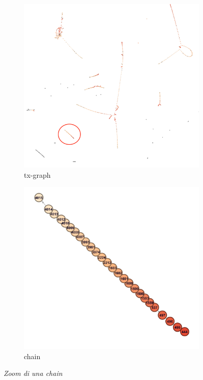 \begin{figure}[htbp]
	\centering
	\begin{subfigure}[b]{0.4\textwidth}
		\includegraphics[width=\textwidth]{figure/zoomchain1}
		\caption{tx-graph}
		\label{fig:zoomchain1}
	\end{subfigure}\quad \qquad
	\begin{subfigure}[b]{0.4 \textwidth}
		\includegraphics[width=\textwidth]{figure/zoomchain2}
		\caption{chain}
		\label{fig:zoomchain2}
	\end{subfigure}
	\caption{\textit{Zoom di una chain}}\label{fig:zoomchain}
\end{figure}

